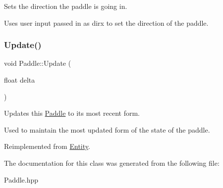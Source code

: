 Sets the direction the paddle is going in. 

Uses user input passed in as dirx to set the direction of the paddle. \mbox{\label{classPaddle_a8a3aa86f567315423f92ecfb5fd3b6f5}} 
\subsubsection{\texorpdfstring{Update()}{Update()}}
{\footnotesize\ttfamily void Paddle\+::\+Update (\begin{DoxyParamCaption}\item[{float}]{delta }\end{DoxyParamCaption})\hspace{0.3cm}{\ttfamily [virtual]}}



Updates this \hyperlink{classPaddle}{Paddle} to its most recent form. 

Used to maintain the most updated form of the state of the paddle. 

Reimplemented from \hyperlink{classEntity_aec10420b2cfc1b9a367d018966c620d3}{Entity}.



The documentation for this class was generated from the following file\+:\begin{DoxyCompactItemize}
\item 
Paddle.\+hpp\end{DoxyCompactItemize}

